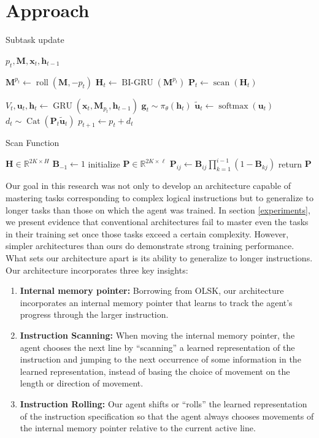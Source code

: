 \documentclass{article}
\newcommand{\algo}[3][
    \STATE $V_t, \mathbf{u}_t, \mathbf{h}_t  \gets \GRU\left(\mathbf{x}_t, \mathbf{M}_{p_t}, \mathbf{h}_{t-1}\right)$
    \STATE $\mathbf{g}_{t} \sim \pi_\theta\left(\mathbf{h}_t\right)$
    \STATE $\tilde{\mathbf{u}}_{t} \gets \softmax\left(\mathbf{u}_t\right)$
    \STATE $d_{t} \sim \Cat\left(\mathbf{P}_t\tilde{\mathbf{u}}_t\right)$ 
    \STATE $p_{t + 1} \gets p_t + d_t$
]
{

\begin{algorithm}[b]
  \caption{#2}
  \label{subtask-update}
  \begin{algorithmic}[1]
    \STATE {\bfseries Inputs:} $p_t, \mathbf{M} , \mathbf{x}_t, \mathbf{h}_{t-1}$
    #3
    #1
  \end{algorithmic}
\end{algorithm}
}
\DeclareMathOperator{\GRU}{GRU}
\DeclareMathOperator{\BIGRU}{BI-GRU}
\DeclareMathOperator{\Cat}{Cat}
\DeclareMathOperator{\roll}{roll}
\DeclareMathOperator{\scan}{scan}
\DeclareMathOperator{\softmax}{softmax}
\begin{document}
\section{Approach}
\algo{Subtask update}{
    \STATE $\mathbf{M}^{p_t} \gets \roll\left(\mathbf{M}, -p_t\right)$
    \STATE ${\mathbf{H}_t} \gets \BIGRU\left(\mathbf{M}^{p_t}\right)$
    \STATE ${\mathbf{P}_t \gets \scan\left(\mathbf{H}_t\right)}$
}{}{}
\begin{algorithm}[b]
  \caption{Scan Function}
  \label{scan}
  \begin{algorithmic}[1]
$\mathbf{H} \in \mathbb{R}^{2K \times H}$ 
\STATE $\mathbf{B}_{-1} \gets 1$  
\STATE initialize $\mathbf{P} \in \mathbb{R}^{2K \times \ell}$
\STATE $\mathbf{P}_{ij} \gets \mathbf{B}_{ij}\prod_{k=1}^{i-1}\left(1 -
\mathbf{B}_{kj}\right)$
\ENDFOR
\ENDFOR
\STATE return $\mathbf{P}$
  \end{algorithmic}
\end{algorithm}

\label{approach}
Our goal in this research was not only to develop an architecture capable of
mastering tasks corresponding to complex logical instructions but to generalize
to longer tasks than those on which the agent was trained.
In section \ref{experiments}, we present evidence that conventional architectures
fail to master even the tasks in their training set once those tasks exceed a
certain complexity.
However, simpler architectures than ours do demonstrate strong training
performance.  What sets our architecture apart is
its ability to generalize to longer instructions. Our architecture incorporates three
key insights:

\begin{enumerate}
  \item \textbf{Internal memory pointer:} Borrowing from OLSK, our architecture incorporates an
    internal memory pointer that learns to track the agent's progress through
    the larger instruction.
  \item \textbf{Instruction Scanning:} When moving the internal memory pointer, the agent
    chooses the next line by ``scanning'' a learned representation of the  instruction and
    jumping to the next occurrence of some information in the learned
    representation, instead of basing the choice of movement on
    the length or direction of movement.
  \item \textbf{Instruction Rolling:} Our agent shifts or ``rolls'' the learned representation of the instruction
    specification so that the agent always chooses movements of the internal memory pointer
    relative to the current active line.
\end{enumerate}
\end{document}

